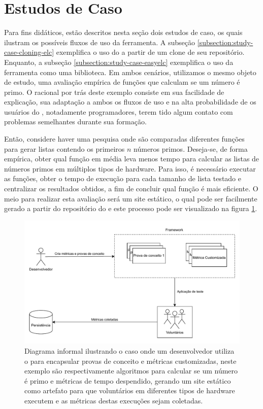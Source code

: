 \documentclass[12pt]{tcc}
\begin{document}
	\section{Estudos de Caso}
	\label{sec:estudos-de-caso}

	Para fins didáticos, estão descritos nesta seção dois estudos de caso, os quais ilustram os possíveis fluxos de uso da ferramenta.
	A subseção \ref{subsection:study-case-cloning-elc} exemplifica o uso do  a partir de um clone de seu repositório.
	Enquanto, a subseção \ref{subsection:study-case-easyelc} exemplifica o uso da ferramenta como uma biblioteca. 
	Em ambos cenários, utilizamos o mesmo objeto de estudo, uma avaliação empírica de funções que calculam se um número é primo.
	O racional por trás deste exemplo consiste em sua facilidade de explicação, sua adaptação a ambos os fluxos de uso e na alta probabilidade de os usuários do , notadamente programadores, terem tido algum contato com problemas semelhantes durante sua formação.

	Então, considere haver uma pesquisa onde são comparadas diferentes funções para gerar listas contendo os primeiros $n$ números primos. 
	Deseja-se, de forma empírica, obter qual função em média leva menos tempo para calcular as listas de números primos em múltiplos tipos de hardware.
	Para isso, é necessário executar as funções, obter o tempo de execução para cada tamanho de lista testado e centralizar os resultados obtidos, a fim de concluir qual função é mais eficiente.
	O meio para realizar esta avaliação será um site estático, o qual pode ser facilmente gerado a partir do repositório do  e este processo pode ser visualizado na figura \ref{fig:diagrama-informal}.

	\begin{figure}[!ht]
		\centering
		\includegraphics[width=\textwidth]{figures/diagrama-informal.pdf}
		\caption{Diagrama informal ilustrando o caso onde um desenvolvedor utiliza o  para encapsular provas de conceito e métricas customizadas, neste exemplo são respectivamente algoritmos para calcular se um número é primo e métricas de tempo despendido, gerando um site estático como artefato para que voluntários em diferentes tipos de hardware executem e as métricas destas execuções sejam coletadas.}
		\label{fig:diagrama-informal}
	\end{figure}
\end{document}
